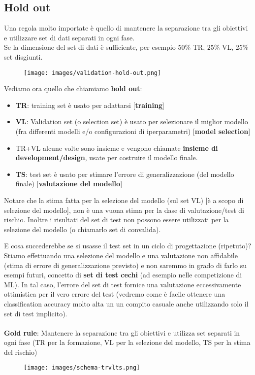 \subsection{Hold out}
Una regola molto importate è quello di mantenere la separazione tra gli obiettivi e utilizzare set di dati separati in ogni fase.\\
Se la dimensione del set di dati è sufficiente, per esempio $50\%$ TR, $25\%$ VL, $25\%$ set disgiunti.
\begin{figure}[h!]
    \centering
    \texttt{[image: images/validation-hold-out.png]}
\end{figure}
\vspace{-5pt}
Vediamo ora quello che chiamiamo \textbf{hold out}:
\begin{itemize}
    \item \textbf{TR}: training set è usato per adattarsi [\textbf{training}]
    \item \textbf{VL}: Validation set (o selection set) è usato per selezionare il miglior modello (fra differenti modelli e/o configurazioni di iperparametri) [\textbf{model selection}]
    \item TR+VL alcune volte sono insieme e vengono chiamate \textbf{insieme di development/design}, usate per costruire il modello finale.
    \item \textbf{TS}: test set è usato per stimare l'errore di generalizzazione (del modello finale) [\textbf{valutazione del modello}] 
\end{itemize}
\begin{note}
    Notare che la stima fatta per la selezione del modello (sul set VL) [è a scopo di selezione del modello], non è una vuona stima per la dase di valutazione/test di rischio. Inoltre
    i risultati del set di test non possono essere utilizzati per la selezione del modello (o chiamarlo set di convalida).
\end{note}
E cosa succederebbe se si usasse il test set in un ciclo di progettazione (ripetuto)?\\
Stiamo effettuando una selezione del modello e una valutazione non affidabile (stima di errore di generalizzazione previsto) e non saremmo in grado di farlo su esempi futuri, concetto di \textbf{set di test cechi} (ad esempio nelle competizione di ML).
In tal caso, l'errore del set di test fornice una valutazione eccessivamente ottimistica per il vero errore del test (vedremo come è facile ottenere una classification accuracy molto alta un un compito casuale anche utilizzando solo il set di test implicito). \\\\
\textbf{Gold rule}: Mantenere la separazione tra gli obiettivi e utilizza set separati in ogni fase (TR per la formazione, VL per la selezione del modello, TS per la stima del rischio)
\begin{figure}[h!]
    \centering
    \texttt{[image: images/schema-trvlts.png]}
\end{figure}
\newpage
